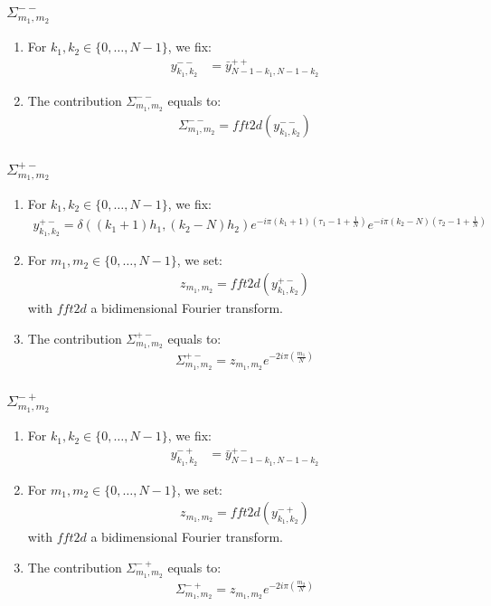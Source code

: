 \subsubsection{$\Sigma_{m_1,m_2}^{--}$}

\begin{enumerate}
\item For $k_1,k_2\in\{0,\hdots,N-1\}$, we fix:
\begin{align*}
y^{--}_{k_1,k_2}&=\bar{y}^{++}_{N-1-k_1,N-1-k_2}
\end{align*}
\item The contribution $\Sigma_{m_1,m_2}^{--}$ equals to:
\begin{align*}
  \Sigma_{m_1,m_2}^{--}=fft2d(y^{--}_{k_1,k_2})
\end{align*}
\end{enumerate}

\subsubsection{$\Sigma_{m_1,m_2}^{+-}$}

\begin{enumerate}
\item For $k_1,k_2\in\{0,\hdots,N-1\}$, we fix:
\begin{align*}
y^{+-}_{k_1,k_2}= \delta((k_1+1)h_1,(k_2-N)h_2)e^{-i\pi (k_1+1)\left(\tau_1-1+\frac{1}{N}\right)}e^{-i\pi (k_2-N)\left(\tau_2-1+\frac{1}{N}\right)}
\end{align*}
\item For $m_1,m_2\in\{0,\hdots,N-1\}$, we set:
\begin{align*}
  z_{m_1,m_2}=fft2d(y^{+-}_{k_1,k_2})
\end{align*}
with $fft2d$ a bidimensional Fourier transform.
\item The contribution $\Sigma_{m_1,m_2}^{+-}$ equals to:
\begin{align*}
  \Sigma_{m_1,m_2}^{+-}=z_{m_1,m_2}e^{-2i\pi\left(\frac{m_1}{N}\right)}
\end{align*}
\end{enumerate}


\subsubsection{$\Sigma_{m_1,m_2}^{-+}$}

\begin{enumerate}
\item For $k_1,k_2\in\{0,\hdots,N-1\}$, we fix:
\begin{align*}
y^{-+}_{k_1,k_2}&=\bar{y}^{+-}_{N-1-k_1,N-1-k_2}
\end{align*}
\item For $m_1,m_2\in\{0,\hdots,N-1\}$, we set:
\begin{align*}
  z_{m_1,m_2}=fft2d(y^{-+}_{k_1,k_2})
\end{align*}
with $fft2d$ a bidimensional Fourier transform.
\item The contribution $\Sigma_{m_1,m_2}^{-+}$ equals to:
\begin{align*}
  \Sigma_{m_1,m_2}^{-+}=z_{m_1,m_2} e^{-2i\pi\left(\frac{m_2}{N}\right)}
\end{align*}
\end{enumerate}


